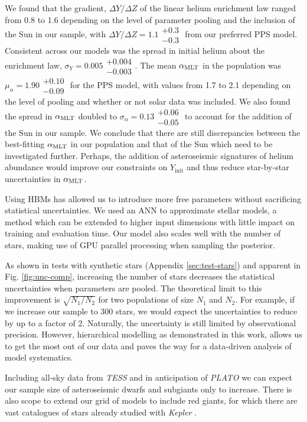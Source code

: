We found that the gradient, $\Delta Y / \Delta Z$ of the linear helium enrichment law ranged from 0.8 to 1.6 depending on the level of parameter pooling and the inclusion of the Sun in our sample, with $\Delta Y / \Delta Z = 1.1\substack{+0.3\\-0.3}$ from our preferred PPS model. Consistent across our models was the spread in initial helium about the enrichment law, $\sigma_Y = 0.005\substack{+0.004\\-0.003}$. The mean ${\alpha_\mathrm{MLT}}$ in the population was $\mu_\alpha = 1.90\substack{+0.10\\-0.09}$ for the PPS model, with values from 1.7 to 2.1 depending on the level of pooling and whether or not solar data was included. We also found the spread in ${\alpha_\mathrm{MLT}}$ doubled to $\sigma_\alpha = 0.13\substack{+0.06\\-0.05}$ to account for the addition of the Sun in our sample. We conclude that there are still discrepancies between the best-fitting ${\alpha_\mathrm{MLT}}$ in our population and that of the Sun which need to be investigated further. Perhaps, the addition of asteroseismic signatures of helium abundance \citep[see e.g.][]{Verma.Raodeo.ea2017} would improve our constraints on $Y_\mathrm{init}$ and thus reduce star-by-star uncertainties in ${\alpha_\mathrm{MLT}}$.

Using HBMs has allowed us to introduce more free parameters without sacrificing statistical uncertainties. We used an ANN to approximate stellar models, a method which can be extended to higher input dimensions with little impact on training and evaluation time. Our model also scales well with the number of stars, making use of GPU parallel processing when sampling the posterior.

As shown in tests with synthetic stars (Appendix \ref{sec:test-stars}) and apparent in Fig. \ref{fig:unc-comp}, increasing the number of stars decreases the statistical uncertainties when parameters are pooled. The theoretical limit to this improvement is $\sqrt{N_1 / N_2}$ for two populations of size $N_1$ and $N_2$. For example, if we increase our sample to 300 stars, we would expect the uncertainties to reduce by up to a factor of 2. Naturally, the uncertainty is still limited by observational precision. However, hierarchical modelling as demonstrated in this work, allows us to get the most out of our data and paves the way for a data-driven analysis of model systematics.

Including all-sky data from \emph{TESS} and in anticipation of \emph{PLATO} \citep{Rauer.Catala.ea2014} we can expect our sample size of asteroseismic dwarfs and subgiants only to increase. There is also scope to extend our grid of models to include red giants, for which there are vast catalogues of stars already studied with \emph{Kepler} \citep{Pinsonneault.Elsworth.ea2018}.


